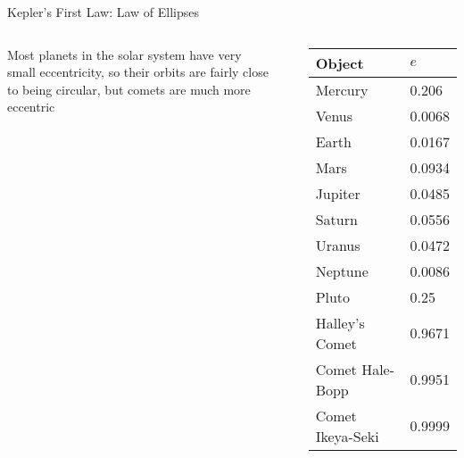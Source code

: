 \documentclass[12pt,compress,aspectratio=169]{beamer}
\begin{document}
\begin{frame}{Kepler's First Law: Law of Ellipses}
  \begin{columns}
    Most planets in the solar system have very small eccentricity, so their
    orbits are fairly close to being circular, but comets are much more
    eccentric
    \begin{center}
    \end{center}
    
    \begin{tabular}{l|l}
      \rowcolor{pink}
      \textbf{Object} & $e$ \\ \hline
      Mercury	& \num{.206} \\
      Venus	& \num{.0068} \\
      Earth	& \num{.0167} \\
      Mars	& \num{.0934} \\
      Jupiter	& \num{.0485} \\
      Saturn	& \num{.0556} \\
      Uranus	& \num{.0472} \\
      Neptune	& \num{.0086} \\
      Pluto	& \num{.25} \\ \hline
      Halley's Comet   & \num{.9671} \\
      Comet Hale-Bopp  & \num{.9951} \\
      Comet Ikeya-Seki & \num{.9999}
    \end{tabular}
  \end{columns}
\end{frame}
\end{document}
